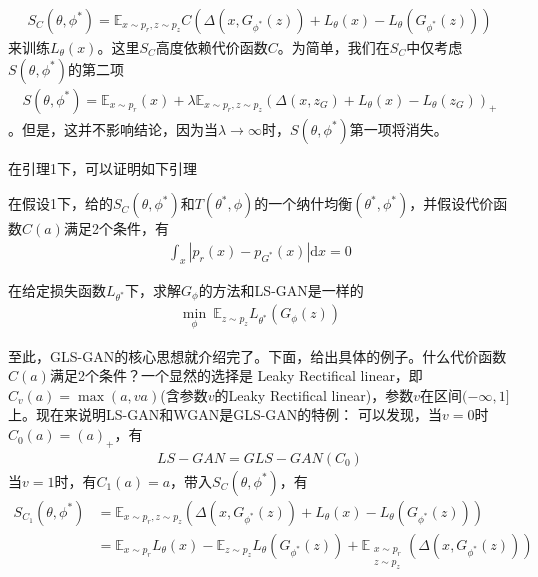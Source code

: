             \begin{align*}
            S_C(\theta,\phi^*) = \mathbb{E}_{x\sim p_r,z\sim  p_z} C(\Delta(x,G_{\phi^*}(z))+L_\theta(x) - L_\theta(G_{\phi^*}(z)))
            \end{align*}
            来训练$L_\theta(x)$。这里$S_C$高度依赖代价函数$C$。为简单，我们在$S_C$中仅考虑$S(\theta,\phi^*)$的第二项
            \begin{align*}
            S(\theta,\phi^*) = \mathbb{E}_{x\sim p_r}(x) + \lambda\mathbb{E}_{x\sim p_r,z\sim p_z}(\Delta(x,z_G)+L_\theta(x) -L_\theta(z_G))_+
            \end{align*}
            。但是，这并不影响结论，因为当$\lambda\to \infty$时，$S(\theta,\phi^*)$第一项将消失。
            \par
            在引理1下，可以证明如下引理
            \begin{lemma}[5]
            在假设1下，给的$S_C(\theta,\phi^*)$和$T(\theta^*,\phi)$的一个纳什均衡$(\theta^*,\phi^*)$，并假设代价函数$C(a)$满足2个条件，有
            \begin{align*}
            \int _x|p_r(x) - p_{G^*}(x)|\mathrm{d}x = 0
            \end{align*}
            \end{lemma}
            \par
            在给定损失函数$L_{\theta^*}$下，求解$G_\phi$的方法和LS-GAN是一样的
            \begin{align}
            \min_\phi \ \mathbb{E}_{z\sim p_z} L_{\theta^*}(G_\phi(z))
            \end{align}
            \par
            至此，GLS-GAN的核心思想就介绍完了。下面，给出具体的例子。什么代价函数$C(a)$满足2个条件？一个显然的选择是 Leaky Rectifical linear，即$C_v(a) = \max(a,va)$(含参数$v$的Leaky Rectifical linear)，参数$v$在区间$(-\infty,1]$上。现在来说明LS-GAN和WGAN是GLS-GAN的特例：
            可以发现，当$v=0$时$C_0(a) = (a)_+$，有
            \begin{align*}
            LS-GAN = GLS-GAN(C_0)
            \end{align*}
             当$v=1$时，有$C_1(a) = a$，带入$S_C(\theta,\phi^*)$，有
            \begin{align*}
            S_{C_1}(\theta,\phi^*) &= \mathbb{E}_{x\sim p_r,z\sim p_z} (\Delta (x,G_{\phi^*}(z))+L_\theta(x) - L_\theta(G_{\phi^*}(z)))\\
            &=\mathbb{E}_{x\sim p_r} L_\theta(x) - \mathbb{E}_{z\sim p_z}L_\theta(G_{\phi^*}(z)) + \mathbb{E}_{\substack{x\sim p_r\\z\sim p_z}}(\Delta(x,G_{\phi^*}(z)))
            \end{align*}
